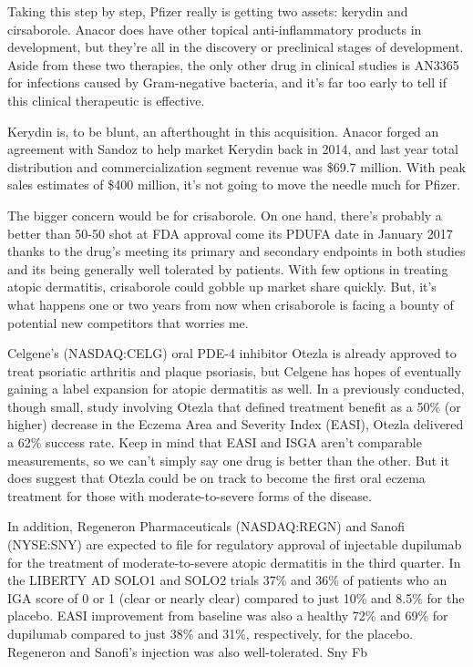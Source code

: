 \documentclass[letterpaper,12pt,english]{sphinxmanual}
\begin{document}
Taking this step by step, Pfizer really is getting two assets: kerydin and cirsaborole. Anacor does have other topical anti-inflammatory products in development, but they're all in the discovery or preclinical stages of development. Aside from these two therapies, the only other drug in clinical studies is AN3365 for infections caused by Gram-negative bacteria, and it's far too early to tell if this clinical therapeutic is effective.

Kerydin is, to be blunt, an afterthought in this acquisition. Anacor forged an agreement with Sandoz to help market Kerydin back in 2014, and last year total distribution and commercialization segment revenue was \$69.7 million. With peak sales estimates of \$400 million, it's not going to move the needle much for Pfizer.

The bigger concern would be for crisaborole. On one hand, there's probably a better than 50-50 shot at FDA approval come its PDUFA date in January 2017 thanks to the drug's meeting its primary and secondary endpoints in both studies and its being generally well tolerated by patients. With few options in treating atopic dermatitis, crisaborole could gobble up market share quickly. But, it's what happens one or two years from now when crisaborole is facing a bounty of potential new competitors that worries me.

Celgene's (NASDAQ:CELG) oral PDE-4 inhibitor Otezla is already approved to treat psoriatic arthritis and plaque psoriasis, but Celgene has hopes of eventually gaining a label expansion for atopic dermatitis as well. In a previously conducted, though small, study involving Otezla that defined treatment benefit as a 50\% (or higher) decrease in the Eczema Area and Severity Index (EASI), Otezla delivered a 62\% success rate. Keep in mind that EASI and ISGA aren't comparable measurements, so we can't simply say one drug is better than the other. But it does suggest that Otezla could be on track to become the first oral eczema treatment for those with moderate-to-severe forms of the disease.

In addition, Regeneron Pharmaceuticals (NASDAQ:REGN) and Sanofi (NYSE:SNY) are expected to file for regulatory approval of injectable dupilumab for the treatment of moderate-to-severe atopic dermatitis in the third quarter. In the LIBERTY AD SOLO1 and SOLO2 trials 37\% and 36\% of patients who an IGA score of 0 or 1 (clear or nearly clear) compared to just 10\% and 8.5\% for the placebo. EASI improvement from baseline was also a healthy 72\% and 69\% for dupilumab compared to just 38\% and 31\%, respectively, for the placebo. Regeneron and Sanofi's injection was also well-tolerated.
Sny Fb
\end{document}
